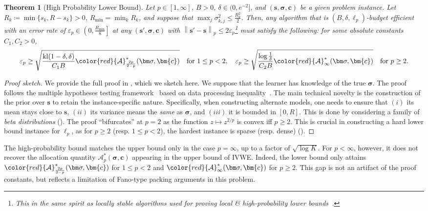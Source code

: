\documentclass{article}
\def\vc{{\bm{c}}}
\def\vs{{\bm{s}}}
\def\gA{{\mathcal{A}}}
\newcommand{\kl}{\mathrm{kl}}
\theoremstyle{plain}
\newtheorem{theorem}{Theorem}[section]
\theoremstyle{definition}
\theoremstyle{plain}
\newcommand{\bignorm}[1]{\left\lVert #1 \right\rVert}
\newcommand{\ivwe}{\textsc{IVWE}}
\begin{document}
\begin{theorem}[High Probability Lower Bound]
\label{thm:lower-bound-whp}
    Let $p \in [1, \infty]$, $B > 0$, $\delta \in (0, e^{-2}]$, and $(\vs, \bm\sigma, \vc)$ be a given problem instance.
    Let $R_k \coloneq \min\{s_k, R - s_k\} > 0$, $R_{\min} = \min_k R_k$, and suppose that $\max_j \sigma_{k,j}^2 \leq \frac{R_k^2}{2}$.
    Then, any algorithm that is $(B, \delta, \ell_p)$-budget efficient with an error rate of $\varepsilon_p \in \left( 0, \frac{R_{\min}}{8} \right]$ at any $(\vs', \bm\sigma, \vc)$ with $\bignorm{\vs' - \vs}_p \leq 2\varepsilon_p$\footnote{This in the same spirit as locally stable algorithms used for proving local \& high-probability lower bounds~\citep{jedra2023identification,yun2019optimal}.} must satisfy the following: for some absolute constants $C_1, C_2 > 0$,
    \begin{equation}
        \varepsilon_p \geq \sqrt{\frac{\kl(1 - \delta, \delta)}{C_1 B} {\color{red}\gA_{\frac{2p}{2-p}}^*(\bm\sigma, \vc)}} \ \ \ \text{for $1 \leq p < 2$}, \quad 
        \varepsilon_p \geq \sqrt{\frac{ \log\frac{1}{\delta}}{C_2 B} {\color{red}\gA^*_{\infty}(\bm\sigma, \vc)}} \ \ \ \text{for $p \geq 2$}.
    \end{equation}
\end{theorem}
\begin{proof}[Proof sketch]
    We provide the full proof in , which we sketch here.
    We suppose that the learner has knowledge of the true $\bm\sigma$.
    The proof follows the multiple hypotheses testing framework~\citep{jedra2023identification} based on data processing inequality~\citep[Lemma 1]{garivier2019lower}.
    The main technical novelty is the construction of the prior over $\vs$ to retain the instance-specific nature.
    Specifically, when constructing alternate models, one needs to ensure that $(i)$ its mean stays close to $\vs$, $(ii)$ its variance means the \emph{same} as $\bm\sigma$, and $(iii)$ it is bounded in $[0, R]$.
    This is done by considering a family of \emph{beta distributions} ({}).
    The proof ``bifurcates'' at $p = 2$ as the function $z \mapsto z^{2/p}$ is convex iff $p \geq 2$.
    This is crucial in constructing a hard lower bound instance for $\ell_p$, as for $p \geq 2$ (resp. $1 \leq p < 2$), the hardest instance is sparse (resp. dense) ({}).
\end{proof}

The high-probability bound matches the upper bound only in the case \(p=\infty\), up to a factor of $\sqrt{\log K}$. For \(p<\infty\), however, it does not recover the allocation quantity \(\gA_p^*(\bm\sigma, \vc)\) appearing in the upper bound of \ivwe{}. Indeed, the lower bound only attains $\color{red}\gA_{\frac{2p}{2-p}}^*(\bm\sigma, \vc)$ for $1 \leq p < 2$ and $\color{red}\gA_\infty^*(\bm\sigma, \vc)$ for $p \geq 2$.
This gap is not an artifact of the proof constants, but reflects a limitation of Fano-type packing arguments in this problem.
\end{document}
